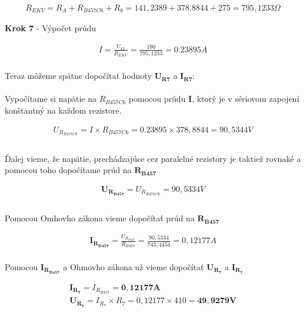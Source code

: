 \begin{gather*}
    R_{EKV} = R_{A} + R_{B457C6} + R_{8} = 141,2389 + 378.8844 + 275 = 795,1233 \Omega
\end{gather*}

\newpage

\begin{center}
\textbf{Krok 7} - Výpočet prúdu
\end{center}

\begin{gather*}
   I = \frac {U_{12}} {R_{EKV}} = \frac {190} {795,1233} = 0.23895 A \\
\end{gather*}

\noindent Teraz môžeme spätne dopočítať hodnoty $\boldsymbol{U_{R7}}$ a $\boldsymbol{I_{R7}}$:
\\\\
Vypočítame si napätie na $R_{B457C6}$ pomocou prúdu $\boldsymbol{I}$, ktorý je v sériovom zapojení konštantný na každom rezistore.

\begin{gather*}
    U_{R_{B457C6}} = I \times R_{B457C6} = 0.23895 \times 378,8844 = 90,5344 V \\\\
\end{gather*}

\noindent Ďalej vieme, že napätie, prechádzajúce cez paralelné rezistory je taktiež rovnaké a pomocou toho dopočítame prúd na $\boldsymbol{R_{B457}}$

\begin{gather*}
    \boldsymbol{U_{R_{B457}}} = U_{R_{B457C6}} = 90,5334 V \\\\
\end{gather*}

\noindent Pomocou Omhovho zákona vieme dopočítať prúd na $\boldsymbol{R_{B457}}$

\begin{gather*}
   \boldsymbol{I_{R_{B457}}} = \frac {U_{R_{B457}}} {R_{B457}} = \frac{90,5334} {743,4454} = 0,12177 A \\
\end{gather*}

\noindent Pomocou $\boldsymbol{I_{R_{B457}}}$ a Ohmovho zákona už vieme dopočítať $\boldsymbol{U_{R_{7}}}$ a $\boldsymbol{I_{R_{7}}}$

\begin{gather*}
   \boldsymbol{I_{R_{7}}} = I_{R_{B457}} = \boldsymbol{0,12177 A} \\
   \boldsymbol{U_{R_{7}}} = I_{R_{7}} \times {R_{7}} = 0,12177 \times 410 = \boldsymbol{49,9279 V} \\\\
\end{gather*}

 

